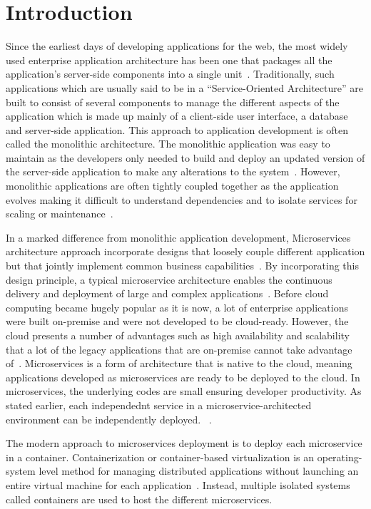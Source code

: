 \section{Introduction}

Since the earliest days of developing applications for the web, the
most widely used enterprise application architecture has been one that
packages all the application's server-side components into a single
unit~\cite{hid-sp18-501-infoq}. Traditionally, such applications which
are usually said to be in a ``Service-Oriented Architecture'' are built
to consist of several components to manage the different aspects of
the application which is made up mainly of a client-side user
interface, a database and server-side application. This approach to
application development is often called the monolithic
architecture. The monolithic application was easy to maintain as the
developers only needed to build and deploy an updated version of the
server-side application to make any alterations to the
system~\cite{hid-sp18-501-mulesoft}. However, monolithic applications
are often tightly coupled together as the application evolves making
it difficult to understand dependencies and to isolate services for
scaling or maintenance~\cite{hid-sp18-501-trello}.
 
In a marked difference from monolithic application development,
Microservices architecture approach incorporate designs
that loosely couple different application but that jointly implement
common business capabilities~\cite{hid-sp18-501-microservicesio}. 
By incorporating this design principle, a typical microservice
architecture enables the continuous delivery and deployment of large and
complex applications~\cite{hid-sp18-501-researchgate}. 
Before cloud computing became hugely popular as it
is now, a lot of enterprise applications were built on-premise and
were not developed to be cloud-ready. However, the cloud presents a
number of advantages such as high availability and scalability that a
lot of the legacy applications that are on-premise cannot take
advantage of~\cite{hid-sp18-501-springer}. Microservices is a form of
architecture that is native to the cloud, meaning applications
developed as microservices are ready to be deployed to the cloud. In
microservices, the underlying codes are small ensuring developer
productivity. As stated earlier, each independednt service in a 
microservice-architected environment can be independently deployed.
~\cite{hid-sp18-501-infoq}.

The modern approach to microservices deployment is to deploy each
microservice in a container. Containerization or container-based
virtualization is an operating-system level method for managing 
distributed applications without launching an entire virtual
machine for each application~\cite{hid-sp18-501-techtarget}. Instead,
multiple isolated systems called containers are used to host the
different microservices.

